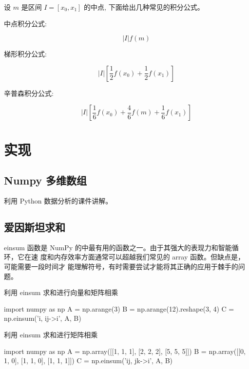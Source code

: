 \documentclass{article}
\begin{document}
\begin{framed}
    设 $m$ 是区间  $I = [x_0, x_1]$ 的中点, 下面给出几种常见的积分公式。
    \begin{description}
        \item[中点积分公式:] 
            $$ |I|f(m)$$
        \item[梯形积分公式:] 
            $$ |I|\left[\frac{1}{2}f(x_0) +\frac{1}{2}f(x_1) \right] $$
        \item[辛普森积分公式:]
            $$|I|\left[\frac{1}{6}f(x_0) + \frac{4}{6}f(m) + \frac{1}{6}f(x_1)\right]$$
    \end{description}
\end{framed}

\section{实现}

\subsection{Numpy 多维数组}

利用 Python 数据分析的课件讲解。

\subsection{爱因斯坦求和}

einsum 函数是 NumPy 的中最有用的函数之一。由于其强大的表现力和智能循环，它在速
度和内存效率方面通常可以超越我们常见的 array 函数。但缺点是，可能需要一段时间才
能理解符号，有时需要尝试才能将其正确的应用于棘手的问题。

\begin{listing}[H]
    \caption{利用 einsum 求和进行向量和矩阵相乘}
    \begin{pythoncode}
        import numpy as np
        A = np.arange(3)
        B = np.arange(12).reshape(3, 4)
        C = np.einsum('i, ij->i', A, B)
    \end{pythoncode}
\end{listing}

\begin{listing}[H]
    \caption{利用 einsum 求和进行矩阵相乘}
    \begin{pythoncode}
        import numpy as np
        A = np.array([[1, 1, 1], [2, 2, 2], [5, 5, 5]])
        B = np.array([[0, 1, 0], [1, 1, 0], [1, 1, 1]])
        C = np.einsum('ij, jk->i', A, B)
    \end{pythoncode}
\end{listing}
\end{document}
